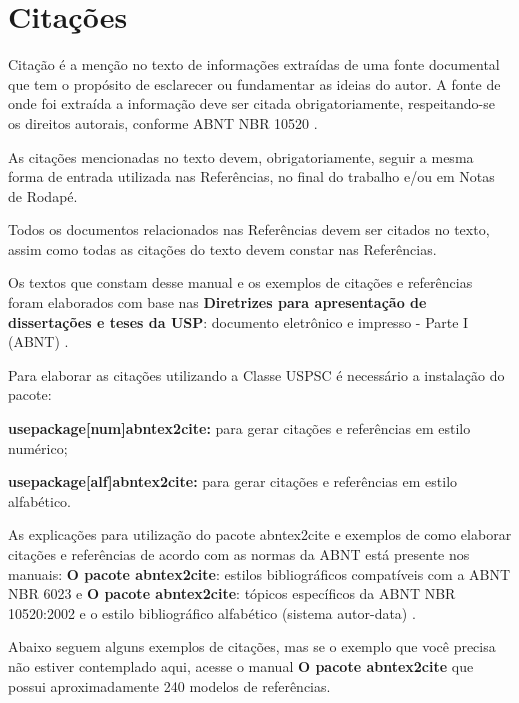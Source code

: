 

\chapter{Citações}
\label{Citações}
Citação é a menção no texto de informações extraídas de uma fonte documental que tem o propósito de esclarecer ou fundamentar as ideias do autor. A fonte de onde foi extraída a informação deve ser citada obrigatoriamente, respeitando-se os direitos autorais, conforme ABNT NBR 10520 \cite{nbr10520}.

As citações mencionadas no texto devem, obrigatoriamente, seguir a mesma forma de entrada utilizada nas Referências, no final do trabalho e/ou em Notas de Rodapé.

Todos os documentos relacionados nas Referências devem ser citados no texto, assim como todas as citações do texto devem constar nas Referências. 

Os textos que constam desse manual e os exemplos de citações e referências foram elaborados com base nas \textbf{Diretrizes para apresentação de dissertações e teses da USP}: documento eletrônico e impresso - Parte I (ABNT) \cite{sibi2009}.

Para elaborar as citações utilizando a Classe USPSC é necessário a instalação do pacote: 

\begin{alineas}
	\item \textbf{usepackage[num]abntex2cite:} para gerar citações e referências em estilo numérico;
	\item \textbf{usepackage[alf]abntex2cite:} para gerar citações e referências em estilo alfabético.
\end{alineas}

As explicações para utilização do pacote abntex2cite e exemplos de como elaborar citações e referências de acordo com as normas da ABNT está presente nos manuais: \textbf{O pacote abntex2cite}: estilos bibliográficos compatíveis com a ABNT NBR 6023 \cite{abnetxcite} e  \textbf{O pacote abntex2cite}: tópicos específicos da ABNT NBR 10520:2002 e o estilo bibliográfico alfabético (sistema autor-data) \cite{abnetxcitealf}.

Abaixo seguem alguns exemplos de citações, mas se o exemplo que você precisa não estiver contemplado aqui, acesse o manual \textbf{O pacote abntex2cite} que possui aproximadamente 240 modelos de referências.

